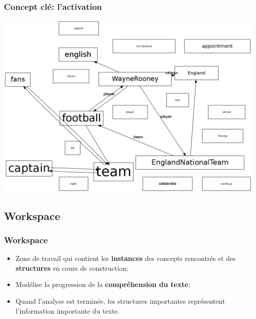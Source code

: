 \documentclass{beamer}
\begin{document}
        \begin{frame}
        \frametitle{Concept clé: l'activation}
            \includegraphics[height=0.8\textheight]{RC/figures/RCetape30.png}
        \end{frame}

    \subsection{Workspace}
        \begin{frame}
        \frametitle{Workspace}
            \begin{itemize}
                \item Zone de travail qui contient les \textbf{instances} des concepts rencontrés et des \textbf{structures} en cours de construction;
                \item Modélise la progression de la \textbf{compréhension du texte};
                \item Quand l'analyse est terminée, les structures importantes représentent l'information importante du texte.
            \end{itemize}
        \end{frame}
\end{document}

